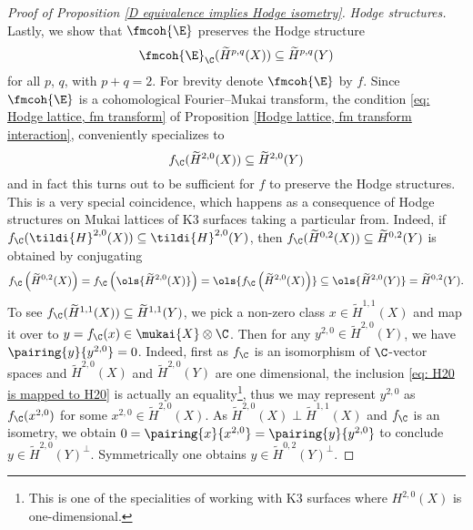 \begin{proof}[Proof of Proposition \ref{D equivalence implies Hodge isometry}]
    \noindent
    \textsl{Hodge structures.}
    Lastly, we show that $\fmcoh{\E}$ preserves the Hodge structure \ie
    \[
        \fmcoh{\E}_\C(\widetilde{H}^{p,q}(X)) \subseteq \widetilde{H}^{p,q}(Y) 
    \]
    for all $p$, $q$, with $p + q = 2$. 
    For brevity denote $\fmcoh{\E}$ by $f$. Since $\fmcoh{\E}$ is a cohomological Fourier--Mukai transform, the condition \eqref{eq: Hodge lattice, fm transform} of Proposition \ref{Hodge lattice, fm transform interaction}, conveniently specializes to 
    \begin{equation}
        f_\C(\widetilde{H}^{2,0}(X)) \subseteq \widetilde{H}^{2,0}(Y)
    \end{equation}
    and in fact this turns out to be sufficient for $f$ to preserve the Hodge structures. This is a very special coincidence, which happens as a consequence of Hodge structures on Mukai lattices of K3 surfaces taking a particular from.
    Indeed, if $f_\C(\tildi{H}^{2,0}(X)) \subseteq \tildi{H}^{2,0}(Y)$, then $f_\C(\widetilde{H}^{0,2}(X)) \subseteq \widetilde{H}^{0,2}(Y)$ is obtained by conjugating
    \[
        f_\C\left(\widetilde{H}^{0,2}(X)\right) = f_\C\left(\ols{\widetilde{H}^{2,0}(X)}\right) = \ols{f_\C\left(\widetilde{H}^{2,0}(X)\right)} \subseteq \ols{\widetilde{H}^{2,0}(Y)} = \widetilde{H}^{0,2}(Y).
    \]
    To see $f_\C(\widetilde{H}^{1,1}(X)) \subseteq \widetilde{H}^{1,1}(Y)$, we pick a non-zero class $x \in \widetilde{H}^{1,1}(X)$ and map it over to $y = f_\C(x) \in \mukai{X} \otimes \C$. Then for any $y^{2,0} \in \widetilde{H}^{2,0}(Y)$, we have $\pairing{y}{y^{2,0}} = 0$. Indeed, first as $f_\C$ is an isomorphism of $\C$-vector spaces and $\widetilde{H}^{2,0}(X)$ and $\widetilde{H}^{2,0}(Y)$ are one dimensional, the inclusion \eqref{eq: H20 is mapped to H20} is actually an equality\footnote{
        This is one of the specialities of working with K3 surfaces where $H^{2,0}(X)$ is one-dimensional.
    }, thus we may represent $y^{2,0}$ as $f_\C(x^{2,0})$ for some $x^{2,0} \in \widetilde{H}^{2,0}(X)$. As $\widetilde{H}^{2,0}(X) \perp \widetilde{H}^{1,1}(X)$ and $f_\C$ is an isometry, we obtain $0 = \pairing{x}{x^{2,0}} = \pairing{y}{y^{2,0}}$ to conclude $y \in \widetilde{H}^{2,0}(Y)^\perp$. Symmetrically one obtains $y \in \widetilde{H}^{0,2}(Y)^\perp$. 


\end{proof}
